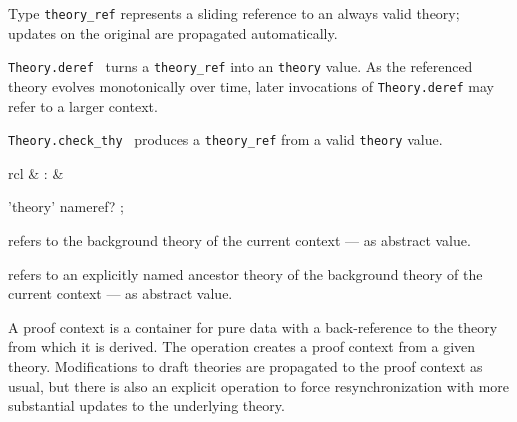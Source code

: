 \begin{isabellebody}
\begin{isamarkuptext}
\begin{description}
  \item Type \verb|theory_ref| represents a sliding reference to
  an always valid theory; updates on the original are propagated
  automatically.

  \item \verb|Theory.deref|~ turns a \verb|theory_ref| into an \verb|theory| value.  As the referenced
  theory evolves monotonically over time, later invocations of \verb|Theory.deref| may refer to a larger context.

  \item \verb|Theory.check_thy|~ produces a \verb|theory_ref| from a valid \verb|theory| value.

  \end{description}%
\end{isamarkuptext}%
\isamarkuptrue%
%
\endisatagmlref
{\isafoldmlref}%
%
\isadelimmlref
%
\endisadelimmlref
%
\isadelimmlantiq
%
\endisadelimmlantiq
%
\isatagmlantiq
%
\begin{isamarkuptext}%
\begin{matharray}{rcl}
  \hypertarget{ML antiquotation.theory}{\hyperlink{ML antiquotation.theory}{\mbox{}}} & : &  \\
  \end{matharray}

  \begin{rail}
  'theory' nameref?
  ;
  \end{rail}

  \begin{description}

  \item {} refers to the background theory of the
  current context --- as abstract value.

  \item {} refers to an explicitly named ancestor
  theory  of the background theory of the current context
  --- as abstract value.

  \end{description}%
\end{isamarkuptext}%
\isamarkuptrue%
%
\endisatagmlantiq
{\isafoldmlantiq}%
%
\isadelimmlantiq
%
\endisadelimmlantiq
%
\isamarkuptrue%
%
\begin{isamarkuptext}%
A proof context is a container for pure data with a
  back-reference to the theory from which it is derived.  The  operation creates a proof context from a given theory.
  Modifications to draft theories are propagated to the proof context
  as usual, but there is also an explicit  operation
  to force resynchronization with more substantial updates to the
  underlying theory.


\end{isamarkuptext}
\end{isabellebody}
